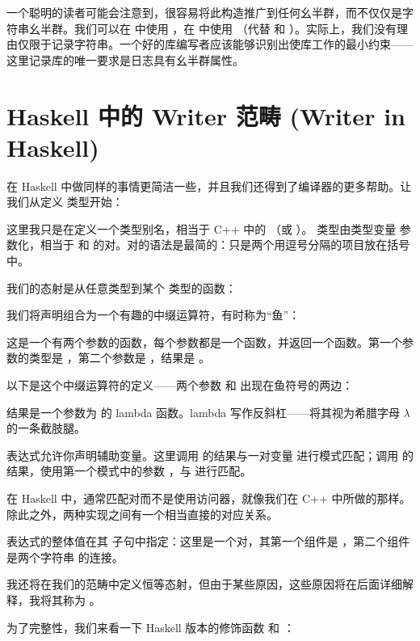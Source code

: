 一个聪明的读者可能会注意到，很容易将此构造推广到任何幺半群，而不仅仅是字符串幺半群。我们可以在  中使用 ，在  中使用 （代替 \code{+} 和 ）。实际上，我们没有理由仅限于记录字符串。一个好的库编写者应该能够识别出使库工作的最小约束——这里记录库的唯一要求是日志具有幺半群属性。

\section{Haskell 中的 Writer 范畴 (Writer in Haskell)}

在 Haskell 中做同样的事情更简洁一些，并且我们还得到了编译器的更多帮助。让我们从定义  类型开始：

这里我只是在定义一个类型别名，相当于 C++ 中的 （或 ）。 类型由类型变量  参数化，相当于  和  的对。对的语法是最简的：只是两个用逗号分隔的项目放在括号中。

我们的态射是从任意类型到某个  类型的函数：

我们将声明组合为一个有趣的中缀运算符，有时称为“鱼”：

这是一个有两个参数的函数，每个参数都是一个函数，并返回一个函数。第一个参数的类型是 ，第二个参数是 ，结果是 。

以下是这个中缀运算符的定义——两个参数  和  出现在鱼符号的两边：

结果是一个参数为  的 lambda 函数。lambda 写作反斜杠——将其视为希腊字母 $\lambda$ 的一条截肢腿。

 表达式允许你声明辅助变量。这里调用  的结果与一对变量  进行模式匹配；调用  的结果，使用第一个模式中的参数 ，与  进行匹配。

在 Haskell 中，通常匹配对而不是使用访问器，就像我们在 C++ 中所做的那样。除此之外，两种实现之间有一个相当直接的对应关系。

 表达式的整体值在其  子句中指定：这里是一个对，其第一个组件是 ，第二个组件是两个字符串  的连接。

我还将在我们的范畴中定义恒等态射，但由于某些原因，这些原因将在后面详细解释，我将其称为 。

为了完整性，我们来看一下 Haskell 版本的修饰函数  和 ：

